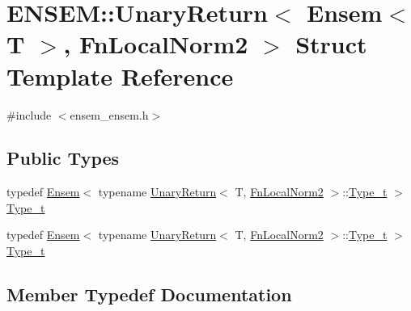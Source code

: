 \hypertarget{structENSEM_1_1UnaryReturn_3_01Ensem_3_01T_01_4_00_01FnLocalNorm2_01_4}{}\section{E\+N\+S\+EM\+:\+:Unary\+Return$<$ Ensem$<$ T $>$, Fn\+Local\+Norm2 $>$ Struct Template Reference}
\label{structENSEM_1_1UnaryReturn_3_01Ensem_3_01T_01_4_00_01FnLocalNorm2_01_4}


{\ttfamily \#include $<$ensem\+\_\+ensem.\+h$>$}

\subsection*{Public Types}
\begin{DoxyCompactItemize}
\item 
typedef \mbox{\hyperlink{classENSEM_1_1Ensem}{Ensem}}$<$ typename \mbox{\hyperlink{structENSEM_1_1UnaryReturn}{Unary\+Return}}$<$ T, \mbox{\hyperlink{structENSEM_1_1FnLocalNorm2}{Fn\+Local\+Norm2}} $>$\+::\mbox{\hyperlink{structENSEM_1_1UnaryReturn_3_01Ensem_3_01T_01_4_00_01FnLocalNorm2_01_4_a683bc7aab1651cd6ec3d3ccb81a0df5f}{Type\+\_\+t}} $>$ \mbox{\hyperlink{structENSEM_1_1UnaryReturn_3_01Ensem_3_01T_01_4_00_01FnLocalNorm2_01_4_a683bc7aab1651cd6ec3d3ccb81a0df5f}{Type\+\_\+t}}
\item 
typedef \mbox{\hyperlink{classENSEM_1_1Ensem}{Ensem}}$<$ typename \mbox{\hyperlink{structENSEM_1_1UnaryReturn}{Unary\+Return}}$<$ T, \mbox{\hyperlink{structENSEM_1_1FnLocalNorm2}{Fn\+Local\+Norm2}} $>$\+::\mbox{\hyperlink{structENSEM_1_1UnaryReturn_3_01Ensem_3_01T_01_4_00_01FnLocalNorm2_01_4_a683bc7aab1651cd6ec3d3ccb81a0df5f}{Type\+\_\+t}} $>$ \mbox{\hyperlink{structENSEM_1_1UnaryReturn_3_01Ensem_3_01T_01_4_00_01FnLocalNorm2_01_4_a683bc7aab1651cd6ec3d3ccb81a0df5f}{Type\+\_\+t}}
\end{DoxyCompactItemize}


\subsection{Member Typedef Documentation}
\mbox{\label{structENSEM_1_1UnaryReturn_3_01Ensem_3_01T_01_4_00_01FnLocalNorm2_01_4_a683bc7aab1651cd6ec3d3ccb81a0df5f}} 
